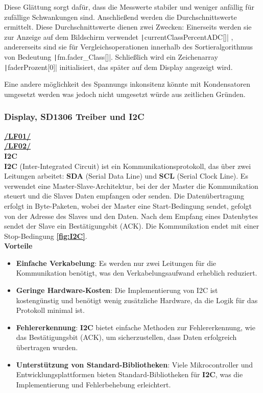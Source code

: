 Diese Glättung sorgt dafür, dass die Messwerte stabiler und weniger anfällig für zufällige Schwankungen sind. Anschließend werden die Durchschnittswerte ermittelt. Diese Durchschnittswerte dienen zwei Zwecken: Einerseits werden sie zur Anzeige auf dem Bildschirm verwendet  \texttt|currentClassPercentADC[]|
, andererseits sind sie für Vergleichsoperationen innerhalb des Sortieralgorithmus von Bedeutung  \texttt|fm.fader_Class[]|.
 Schließlich wird ein Zeichenarray \texttt|faderProzent[0]| initialisiert, das später auf dem Display angezeigt wird. 
 
Eine andere möglichkeit des Spannungs inkonsitenz könnte mit Kondensatoren umgesetzt werden was jedoch nicht umgesetzt würde aus zeitlichen Gründen.

\newpage
\subsubsection{Display, SD1306 Treiber und I2C}
\textbf{\hyperlink{LF01_Link}{/LF01/}} \\
\textbf{\hyperlink{LF02_Link}{/LF02/}} \\

\hypertarget{I2C_target}{\textbf{I2C}} \\

\textbf{I2C}\cite{ic2-reference} (Inter-Integrated Circuit) ist ein Kommunikationsprotokoll, das über zwei Leitungen arbeitet: \textbf{SDA} (Serial Data Line) und \textbf{SCL} (Serial Clock Line). Es verwendet eine Master-Slave-Architektur, bei der der Master die Kommunikation steuert und die Slaves Daten empfangen oder senden. Die Datenübertragung erfolgt in Byte-Paketen, wobei der Master eine Start-Bedingung sendet, gefolgt von der Adresse des Slaves und den Daten. Nach dem Empfang eines Datenbytes sendet der Slave ein Bestätigungsbit (ACK). Die Kommunikation endet mit einer Stop-Bedingung \textbf{\autoref{fig:I2C}}. \\

\textbf{Vorteile}\\

\begin{itemize}
	\item \textbf{Einfache Verkabelung}: Es werden nur zwei Leitungen für die Kommunikation benötigt, was den Verkabelungsaufwand erheblich reduziert.
	\item \textbf{Geringe Hardware-Kosten}: Die Implementierung von I2C ist kostengünstig und benötigt wenig zusätzliche Hardware, da die Logik für das Protokoll minimal ist.
	\item \textbf{Fehlererkennung}: \textbf{I2C} bietet einfache Methoden zur Fehlererkennung, wie das Bestätigungsbit (ACK), um sicherzustellen, dass Daten erfolgreich übertragen wurden.
	\item \textbf{Unterstützung von Standard-Bibliotheken}: Viele Mikrocontroller und Entwicklungsplattformen bieten Standard-Bibliotheken für \textbf{I2C}, was die Implementierung und Fehlerbehebung erleichtert.
\end{itemize}

